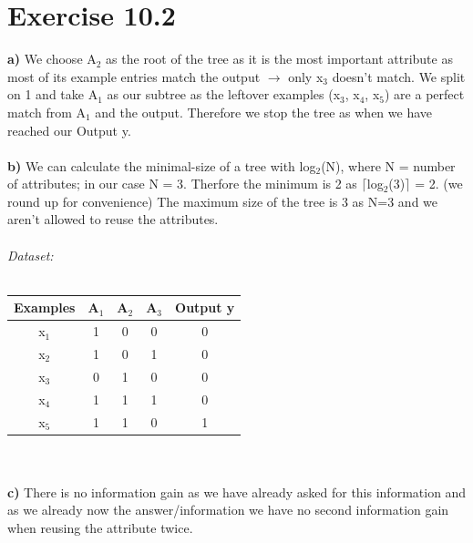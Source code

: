 \documentclass[12pt]{article}
\begin{document}
\section*{Exercise 10.2}
\textbf{a)} We choose A$_{2}$ as the root of the tree as it is the most important attribute as most of its example entries match the output $\to$ only x$_{3}$ doesn't match. We split on 1 and take A$_{1}$ as our subtree as the leftover examples (x$_{3}$, x$_{4}$, x$_{5}$) are a perfect match from A$_{1}$ and the output. Therefore we stop the tree as when we have reached our Output y.\\\\
\textbf{b)} We can calculate the minimal-size of a tree with log$_{2}$(N), where N = number of attributes; in our case N = 3. Therfore the minimum is 2 as $\lceil$log$_{2}$(3)$\rceil$ = 2. (we round up for convenience) The maximum size of the tree is 3 as N=3 and we aren't allowed to reuse the attributes.\\\\
\emph{Dataset:}\\\\
\begin{tabular}[h]{c|c|c|c|c}
Examples & A$_{1}$ & A$_{2}$ & A$_{3}$ & Output y\\
\hline
x$_{1}$ & 1 & 0 & 0 & 0\\
\hline
x$_{2}$ & 1 & 0 & 1 & 0\\
\hline
x$_{3}$ & 0 & 1 & 0 & 0\\
\hline
x$_{4}$ & 1 & 1 & 1 & 0\\
\hline
x$_{5}$ & 1 & 1 & 0 & 1\\
\end{tabular}\\\\
\textbf{c)} There is no information gain as we have already asked for this information and as we already now the answer/information we have no second information gain when reusing the attribute twice.
\end{document}
